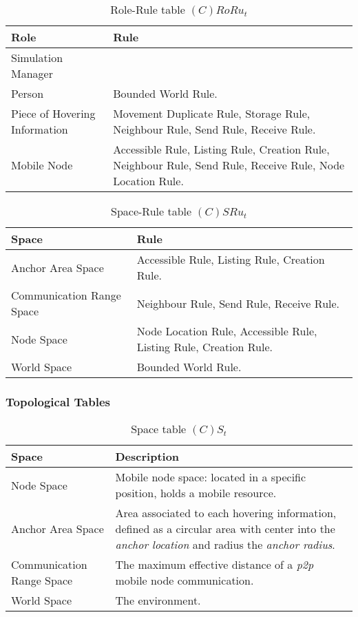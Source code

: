 \begin{table}[H]
	\centering
	\begin{tabular}{|p{4cm}|p{8cm}|}
			\hline
			\textbf{Role} & \textbf{Rule} \\
			\hline
			Simulation Manager & \\
			\hline
			Person & Bounded World Rule. \\
			\hline
			Piece of Hovering Information &  Movement Duplicate
			Rule, Storage Rule, Neighbour Rule, Send Rule, Receive Rule.  \\
			\hline
			Mobile Node & Accessible Rule, Listing Rule, Creation Rule, Neighbour
			Rule, Send Rule, Receive Rule, Node Location Rule. \\
			\hline
		\end{tabular}
	\caption{Role-Rule table $(C)RoRu_t$}
	\label{tab:crorut}
\end{table}

\begin{table}[H]
	\centering
	\begin{tabular}{|p{4cm}|p{8cm}|}
			\hline
			\textbf{Space} & \textbf{Rule} \\
			\hline
			Anchor Area Space & Accessible Rule, Listing Rule, Creation Rule. \\
			\hline
			Communication Range Space & Neighbour Rule, Send Rule, Receive Rule. \\
			\hline
			Node Space & Node Location Rule, Accessible Rule, Listing Rule, Creation Rule. \\
			\hline
			World Space & Bounded World Rule. \\
			\hline
		\end{tabular}
	\caption{Space-Rule table $(C)SRu_t$}
	\label{tab:cot}
\end{table}

\subsubsection{Topological Tables}

\begin{table}[H]
	\centering
	\begin{tabular}{|p{4cm}|p{8cm}|}
			\hline
			\textbf{Space} & \textbf{Description} \\
			\hline
			Node Space & Mobile node space: located in a specific position, holds a
			mobile resource. \\
			\hline
			Anchor Area Space & Area associated to each hovering information, defined as a
			circular area with center into the \emph{anchor location} and radius the
			\emph{anchor radius}.\\
			\hline
			Communication Range Space & The maximum effective distance of a \emph{p2p}
			mobile node communication. \\
			\hline
			World Space & The environment. \\
			\hline
		\end{tabular}
	\caption{Space table $(C)S_t$}
	\label{tab:st}
\end{table}

